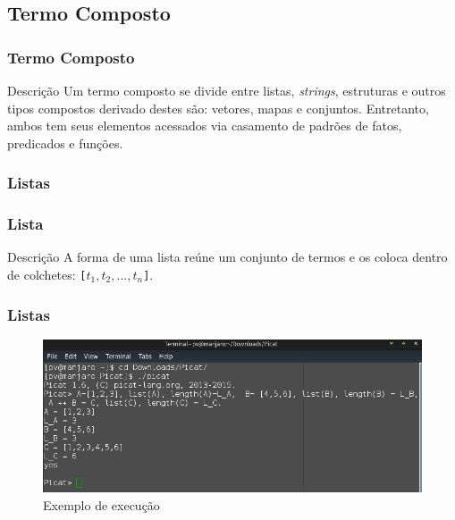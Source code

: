 \documentclass[sans]{beamer}
\begin{document}

\subsection{Termo Composto}
\begin{frame}[fragile]   %
\frametitle{Termo Composto}
\begin{block}{Descrição}
 Um termo composto se divide entre listas, \textit{strings}, estruturas e outros tipos compostos derivado destes são: vetores, mapas e conjuntos. 
 Entretanto, ambos tem seus elementos acessados via casamento de padrões de fatos, predicados e funções.
\end{block}
\end{frame}


\subsubsection{Listas}
\begin{frame}[fragile]   %
\frametitle{Lista}
\begin{block}{Descrição}
 A forma de uma lista reúne um conjunto de termos e os coloca dentro de colchetes: \texttt{[$t_1,t_2, ... ,t_n$]}.
\end{block}
\end{frame}


\begin{frame}[fragile]   %
\frametitle{Listas}

 \begin{figure}[!ht]
 \centering
 \includegraphics[width=.9\textwidth]{picatlista.png}
 \caption{Exemplo de execução}
 \end{figure}

\end{frame}
\end{document}
